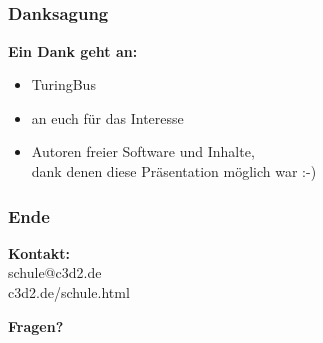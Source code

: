 \documentclass[12pt]{beamer}
\begin{document}
\subsection{}
	\begin{frame}
		\frametitle{Danksagung}
		\begin{center}
			\textbf{Ein Dank geht an:}
			\begin{itemize}
				\item<1-> TuringBus
				\item<2-> an euch für das Interesse
				\item<3-> Autoren freier Software und Inhalte,\\ dank denen diese Präsentation möglich war  :-)
			\end{itemize}
		\end{center}
	\end{frame}
	  
	\begin{frame}
		\frametitle{Ende}
		\begin{center}
			\textbf{Kontakt: } \\
			schule@c3d2.de \\
			c3d2.de/schule.html \\
			\vspace{10pt}

			\textbf{Fragen?} 
		\end{center}
	\end{frame}
	
\end{document}
